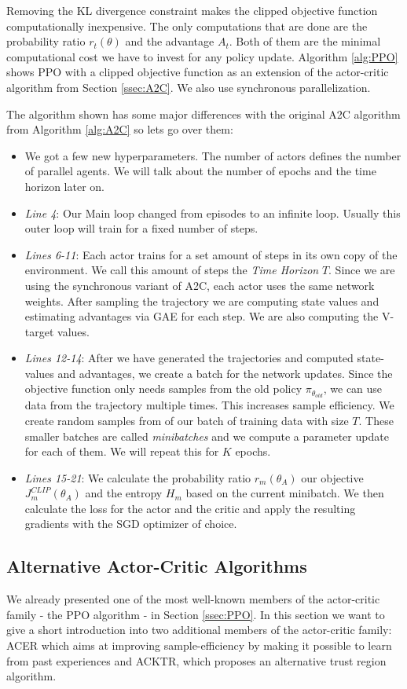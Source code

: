 Removing the KL divergence constraint makes the clipped objective function computationally inexpensive. The only computations that are done are the probability ratio $r_t(\theta)$ and the advantage $A_t$. Both of them are the minimal computational cost we have to invest for any policy update. Algorithm \ref{alg:PPO} shows PPO with a clipped objective function as an extension of the actor-critic algorithm from Section \ref{ssec:A2C}. We also use synchronous parallelization.

 The algorithm shown has some major differences with the original A2C algorithm from Algorithm \ref{alg:A2C} so lets go over them:
\begin{itemize}
  \item We got a few new hyperparameters. The number of actors defines the number of parallel agents. We will talk about the number of epochs and the time horizon later on.
  \item \textit{Line 4}: Our Main loop changed from episodes to an infinite loop. Usually this outer loop will train for a fixed number of steps.
  \item \textit{Lines 6-11}: Each actor trains for a set amount of steps in its own copy of the environment. We call this amount of steps the \textit{Time Horizon} $T$. Since we are using the synchronous variant of A2C, each actor uses the same network weights. After sampling the trajectory we are computing state values and estimating advantages via GAE for each step. We are also computing the V-target values.
  \item \textit{Lines 12-14}: After we have generated the trajectories and computed state-values and advantages, we create a batch for the network updates. Since the objective function only needs samples from the old policy $\pi_{\theta_{old}}$, we can use data from the trajectory multiple times. This increases sample efficiency. We create random samples from of our batch of training data with size $T$. These smaller batches are called \textit{minibatches} and we compute a parameter update for each of them. We will repeat this for $K$ epochs.
  \item \textit{Lines 15-21}: We calculate the probability ratio $r_m(\theta_A)$ our objective $J^{CLIP}_m(\theta_A)$ and the entropy $H_m$ based on the current minibatch. We then calculate the loss for the actor and the critic and apply the resulting gradients with the SGD optimizer of choice. 
\end{itemize}

\subsection{Alternative Actor-Critic Algorithms} \label{ssec:AlternativeCombinedMethods}
We already presented one of the most well-known members of the actor-critic family - the PPO algorithm - in Section \ref{ssec:PPO}. In this section we want to give a short introduction into two additional members of the actor-critic family: ACER which aims at improving sample-efficiency by making it possible to learn from past experiences and ACKTR, which proposes an alternative trust region algorithm. 

